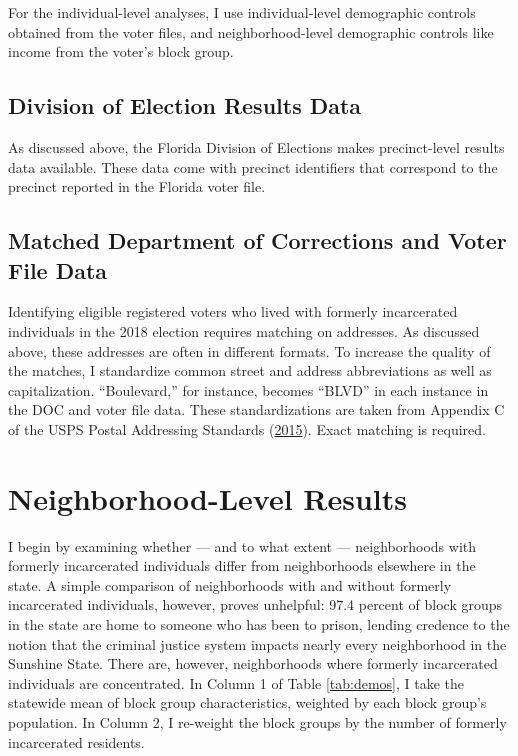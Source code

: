 \documentclass[
  12pt,
]{article}
\begin{document}
For the individual-level analyses, I use individual-level demographic controls obtained from the voter files, and neighborhood-level demographic controls like income from the voter's block group.

\hypertarget{division-of-election-results-data}{%
\subsection*{Division of Election Results Data}\label{division-of-election-results-data}}

As discussed above, the Florida Division of Elections makes precinct-level results data available. These data come with precinct identifiers that correspond to the precinct reported in the Florida voter file.

\hypertarget{matched-department-of-corrections-and-voter-file-data}{%
\subsection*{Matched Department of Corrections and Voter File Data}\label{matched-department-of-corrections-and-voter-file-data}}

Identifying eligible registered voters who lived with formerly incarcerated individuals in the 2018 election requires matching on addresses. As discussed above, these addresses are often in different formats. To increase the quality of the matches, I standardize common street and address abbreviations as well as capitalization. ``Boulevard,'' for instance, becomes ``BLVD'' in each instance in the DOC and voter file data. These standardizations are taken from Appendix C of the USPS Postal Addressing Standards (\protect\hyperlink{ref-USPS2015}{2015}). Exact matching is required.

\hypertarget{neighborhood-level-results}{%
\section*{Neighborhood-Level Results}\label{neighborhood-level-results}}

I begin by examining whether --- and to what extent --- neighborhoods with formerly incarcerated individuals differ from neighborhoods elsewhere in the state. A simple comparison of neighborhoods with and without formerly incarcerated individuals, however, proves unhelpful: 97.4 percent of block groups in the state are home to someone who has been to prison, lending credence to the notion that the criminal justice system impacts nearly every neighborhood in the Sunshine State. There are, however, neighborhoods where formerly incarcerated individuals are concentrated. In Column 1 of Table \ref{tab:demos}, I take the statewide mean of block group characteristics, weighted by each block group's population. In Column 2, I re-weight the block groups by the number of formerly incarcerated residents.
\end{document}
